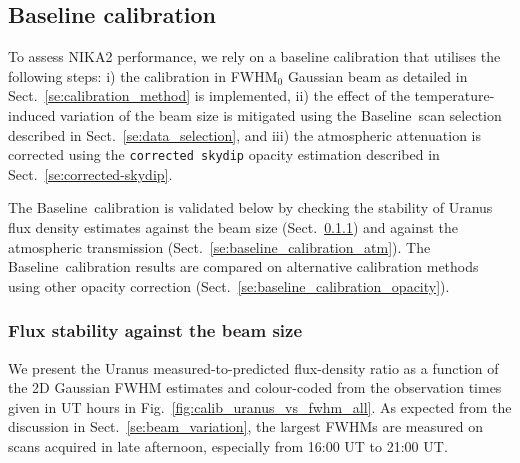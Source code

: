 \documentclass[traditionalabstract]{aa}
\newcommand{\baseline}{Baseline}%
\newcommand{\lp}[1]{#1}
\begin{document}
{\subsection{Baseline calibration}
\label{se:baseline_calibration}

To assess NIKA2 performance, we rely on a baseline calibration that
utilises the following steps: i) the calibration in FWHM$_0$ Gaussian beam
as detailed in Sect.~\ref{se:calibration_method} is implemented, ii)
the effect of the temperature-induced variation of the beam size is
mitigated using the \baseline\ scan selection described in
Sect.~\ref{se:data_selection}, and iii) the
atmospheric attenuation is corrected using the {\tt corrected skydip}
opacity estimation described in Sect.~\ref{se:corrected-skydip}.

The \baseline\ calibration is validated below by checking the
stability of Uranus flux density estimates against the beam size
(Sect.~\ref{se:baseline_calibration_scans}) and against the
atmospheric transmission
(Sect.~\ref{se:baseline_calibration_atm}). The \baseline\
calibration results are compared on alternative calibration methods
using other opacity correction (Sect.~\ref{se:baseline_calibration_opacity}).


\subsubsection{Flux stability against the beam size}
\label{se:baseline_calibration_scans}

We present the Uranus measured-to-predicted flux-density ratio as a
function of the 2D Gaussian FWHM estimates and colour-coded from the
observation times given in UT hours in
Fig.~\ref{fig:calib_uranus_vs_fwhm_all}. {\lp As expected from the
discussion in Sect.~\ref{se:beam_variation}, the largest FWHMs are
measured on scans acquired in late afternoon, especially from 16:00 UT
to 21:00 UT.}  


}
\end{document}
